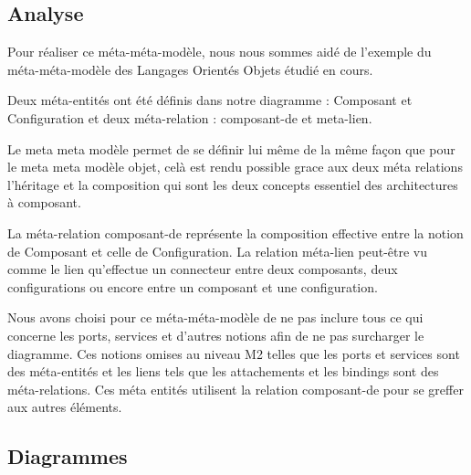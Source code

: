 \documentclass[11pt,a4paper]{article}
\begin{document}


\subsection{Analyse}
Pour réaliser ce méta-méta-modèle, nous nous sommes aidé de l'exemple du
méta-méta-modèle des Langages Orientés Objets étudié en cours.

Deux méta-entités ont été définis dans notre diagramme : Composant et
Configuration et deux méta-relation : composant-de et meta-lien.

Le meta meta modèle permet de se définir lui même de la même façon que pour le meta meta modèle objet, celà est rendu possible grace aux deux méta relations l'héritage et la composition qui sont les deux concepts essentiel des architectures à composant.

La méta-relation composant-de représente la composition effective entre la
notion de Composant et celle de Configuration. La relation méta-lien peut-être
vu comme le lien qu'effectue un connecteur entre deux composants, deux
configurations ou encore entre un composant et une configuration.

Nous avons choisi pour ce méta-méta-modèle de ne pas inclure tous ce qui concerne
les ports, services et d'autres notions afin de ne pas surcharger le diagramme.
Ces notions omises au niveau M2 telles que les ports et services sont des
méta-entités et les liens tels que les attachements et les bindings sont des
méta-relations. Ces méta entités utilisent la relation composant-de pour se greffer aux autres éléments.


\subsection{Diagrammes}
\end{document}
